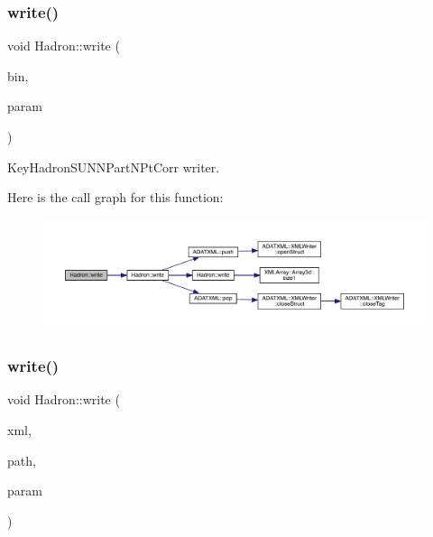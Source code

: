 \subsubsection{\texorpdfstring{write()}{write()}\hspace{0.1cm}{\footnotesize\ttfamily [48/95]}}
{\footnotesize\ttfamily void Hadron\+::write (\begin{DoxyParamCaption}\item[{\mbox{\hyperlink{classADATIO_1_1BinaryWriter}{Binary\+Writer}} \&}]{bin,  }\item[{const \mbox{\hyperlink{structHadron_1_1KeyHadronSUNNPartNPtCorr__t_1_1NPoint__t}{Key\+Hadron\+S\+U\+N\+N\+Part\+N\+Pt\+Corr\+\_\+t\+::\+N\+Point\+\_\+t}} \&}]{param }\end{DoxyParamCaption})}



Key\+Hadron\+S\+U\+N\+N\+Part\+N\+Pt\+Corr writer. 

Here is the call graph for this function\+:
\nopagebreak
\begin{figure}[H]
\begin{center}
\leavevmode
\includegraphics[width=350pt]{d1/daf/namespaceHadron_acd7055ec4bbdda7ceb335f7271aee72e_cgraph}
\end{center}
\end{figure}
\mbox{\label{namespaceHadron_a9309edc67ae704a831f01ae854c5bf12}} 
\subsubsection{\texorpdfstring{write()}{write()}\hspace{0.1cm}{\footnotesize\ttfamily [49/95]}}
{\footnotesize\ttfamily void Hadron\+::write (\begin{DoxyParamCaption}\item[{\mbox{\hyperlink{classADATXML_1_1XMLWriter}{X\+M\+L\+Writer}} \&}]{xml,  }\item[{const std\+::string \&}]{path,  }\item[{const \mbox{\hyperlink{structHadron_1_1HadronVertex__t}{Hadron\+Vertex\+\_\+t}} \&}]{param }\end{DoxyParamCaption})}



